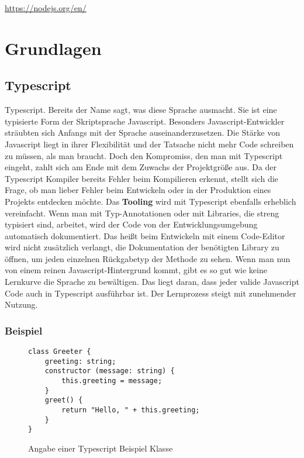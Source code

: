 \begin{center}
\url{https://nodejs.org/en/}
\end{center}

\section{Grundlagen}

\subsection{Typescript}
Typescript. Bereits der Name sagt, was diese Sprache ausmacht. Sie ist eine typisierte Form der Skriptsprache Javascript. Besonders Javascript-Entwickler sträubten sich Anfangs mit der Sprache auseinanderzusetzen. Die Stärke von Javascript liegt in ihrer Flexibilität und der Tatsache nicht mehr Code schreiben zu müssen, als man braucht. Doch den Kompromiss, den man mit Typescript eingeht, zahlt sich am Ende mit dem Zuwachs der Projektgröße aus. Da der Typescript Kompiler bereits Fehler beim Kompilieren erkennt, stellt sich die Frage, ob man lieber Fehler beim Entwickeln oder in der Produktion eines Projekts entdecken möchte. Das \textbf{Tooling} wird mit Typescript ebenfalls erheblich vereinfacht. Wenn man mit Typ-Annotationen oder mit Libraries, die streng typisiert sind, arbeitet, wird der Code von der Entwicklungsumgebung automatisch dokumentiert. Das heißt beim Entwickeln mit einem Code-Editor wird nicht zusätzlich verlangt, die Dokumentation der benötigten Library zu öffnen, um jeden einzelnen Rückgabetyp der Methode zu sehen. Wenn man nun von einem reinen Javascript-Hintergrund kommt, gibt es so gut wie keine Lernkurve die Sprache zu bewältigen. Das liegt daran, dass jeder valide Javascript Code auch in Typescript ausführbar ist. Der Lernprozess steigt mit zunehmender Nutzung.

\subsubsection{Beispiel}

\begin{figure}[H]
\begin{lstlisting}[basicstyle=\small]
class Greeter {
    greeting: string;
    constructor (message: string) {
        this.greeting = message;
    }
    greet() {
        return "Hello, " + this.greeting;
    }
}  
\end{lstlisting}
\caption{Angabe einer Typescript Beispiel Klasse \cite{typescript-example}}
\end{figure}

